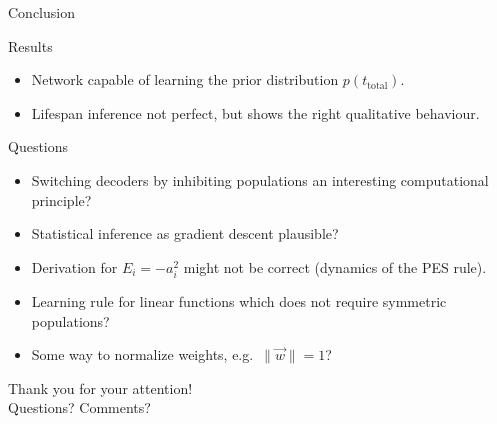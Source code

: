 \documentclass[aspectratio=169]{beamer}
\begin{document}
\begin{frame}{Conclusion}
	\begin{block}{Results}
		\begin{itemize}
			\setlength{\itemsep}{0.25cm}
			\item Network capable of learning the prior distribution $p(t_\mathrm{total})$.
			\item Lifespan inference not perfect, but shows the right qualitative behaviour.
		\end{itemize}
	\end{block}
	\begin{block}{Questions}
		\begin{itemize}
			\setlength{\itemsep}{0.25cm}
			\item Switching decoders by inhibiting populations an interesting computational principle?
			\item Statistical inference as gradient descent plausible?
			\item Derivation for $E_i = -a_i^2$ might not be correct (dynamics of the PES rule).
			\item Learning rule for linear functions which does not require symmetric populations?
			\item Some way to normalize weights, e.g.~$\|\vec w\| = 1$?
		\end{itemize}
	\end{block}
\end{frame}


\begingroup
{}
\begin{frame}
	\centering
	\color{white}
	\vspace{0.5cm}
	{\huge Thank you for your attention!\\\normalsize Questions? Comments?}\\[0.25cm]
\end{frame}
\endgroup
\end{document}
